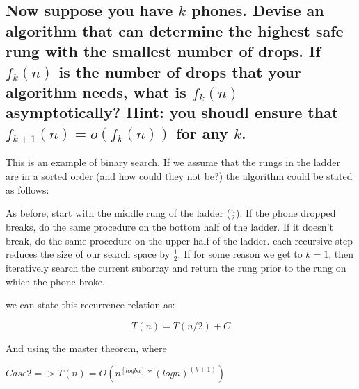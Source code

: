 \documentclass[titlepage]{article}\usepackage[]{graphicx}\usepackage[]{color}
\begin{document}
\subsection{Now suppose you have $k$ phones. Devise an algorithm that can
  determine the highest safe rung with the smallest number of drops. If
  $f_k(n)$
  is the number of drops that your algorithm needs, what is 
  $f_k(n)$ asymptotically? Hint: you shoudl ensure that 
  $f_{k+1}(n) = o(f_k(n))$ for any $k$.}

  This is an example of binary search. If we assume that the rungs in the
  ladder are in a sorted order (and how could they not be?) the algorithm could
  be stated as follows:

  As before, start with the middle rung of the ladder ($\frac{n}{2}$). If the
  phone dropped breaks, do the same procedure on the bottom half of the ladder.
  If it doesn't break, do the same procedure on the upper half of the ladder.
  each recursive step reduces the size of our search space by $\frac{1}{2}$. If
  for some reason we get to $k=1$, then iteratively search the current subarray
  and return the rung prior to the rung on which the phone broke.


%
%

  we can state this recurrence relation as:

  \[ T(n) = T(n/2) + C \]

  And using the master theorem, where 

$ Case 2 => T(n) = O(n^[logb a] * (log n)^(k+1)) $ 



\end{document}
